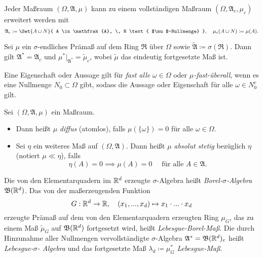 \documentclass{cheat-sheet}
\newcommand{\Alg}{\mathfrak{A}} %
\newcommand{\Ring}{\mathfrak{R}} %
\newcommand{\Bor}{\mathfrak{B}} %
\begin{document}
\begin{satz}
  Jeder Maßraum $(\Omega, \Alg, \mu)$ kann zu einem vollständigen Maßraum $(\Omega, \Alg_c, \mu_c)$ erweitert werden mit
  \[
    \Alg_c \coloneqq \Set{ A \cup N }{ A \in \Alg, \, N \text{ $\mu$-Nullmenge} }, \quad
    \mu_c(A \cup N) \coloneqq \mu(A).
  \]
\end{satz}

\begin{satz}
  Sei $\mu$ ein $\sigma$-endliches Prämaß auf dem Ring $\Ring$ über $\Omega$ sowie $\widetilde{\Alg} \coloneqq \sigma(\Ring)$. Dann gilt $\Alg^* = \Alg_c$ und $\mu^*|_{\Alg^*} = \widetilde{\mu}_c$, wobei $\widetilde{\mu}$ das eindeutig fortgesetzte Maß ist.
\end{satz}


\begin{sprech}
  Eine Eigenschaft oder Aussage gilt für \emph{fast alle} $\omega \in \Omega$ oder \emph{$\mu$-fast-überall}, wenn es eine Nullmenge $N_0 \subset \Omega$ gibt, sodass die Aussage oder Eigenschaft für alle $\omega \in N_0^c$ gilt.
\end{sprech}

\begin{defn}
  Sei $(\Omega, \Alg, \mu)$ ein Maßraum.
  \begin{itemize}
    \item Dann heißt $\mu$ \emph{diffus} (atomlos), falls $\mu(\{ \omega \}) = 0$ für alle $\omega \in \Omega$.
    \item Sei $\eta$ ein weiteres Maß auf $(\Omega, \Alg)$. Dann heißt $\mu$ \emph{absolut stetig} bezüglich $\eta$ (notiert $\mu \ll \eta$), falls
  \[ \eta(A) = 0 \implies \mu(A) = 0 \quad \text{ für alle } A \in \Alg. \]
  \end{itemize}
\end{defn}




\begin{defn}
  Die von den Elementarquadern im $\mathbb{R}^d$ erzeugte $\sigma$-Algebra heißt \emph{Borel-$\sigma$-Algebra} $\Bor(\R^d)$. Das von der maßerzeugenden Funktion
  \[ G : \mathbb{R}^d \to \mathbb{R}, \quad (x_1, ..., x_d) \mapsto x_1 \cdot ... \cdot x_d \]
  erzeugte Prämaß auf dem von den Elementarquadern erzeugten Ring $\mu_G$, das zu einem Maß $\widetilde{\mu}_G$ auf $\Bor(\R^d)$ fortgesetzt wird, heißt \emph{Lebesgue-Borel-Maß}. Die durch Hinzunahme aller Nullmengen vervollständigte $\sigma$-Algebra $\Alg^* = \Bor(\R^d)_c$ heißt \emph{Lebesgue-$\sigma$- Algebra} und das fortgesetzte Maß $\lambda_d \coloneqq \mu_G^*$ \emph{Lebesgue-Maß}.
\end{defn}
\end{document}
